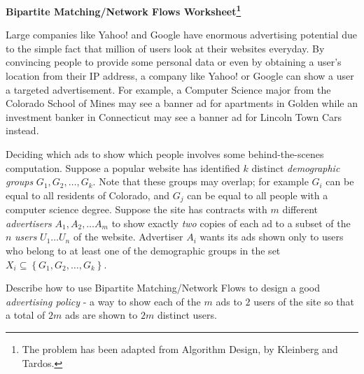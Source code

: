 \documentclass[12pt]{article}
\begin{document}
\newcommand{\I}{\mbox{{\em Int}}}
\newcommand{\lt}{\mbox{{\em left}}}
\newcommand{\rt}{\mbox{{\em right}}}
\newcommand{\ld}{\Delta^l}
\newcommand{\rd}{\Delta^r}
\newcommand{\lsp}[1]{\large\renewcommand{\baselinestretch}{#1}\normalsize}
\newcommand{\hsp}{\hspace{.2in}}

\def\Endwhile{\mbox{\bf endwhile\ }}
\def\Or{\mbox{\bf or\ }}
\def\Do{\mbox{\bf do\ }}
\def\Downto{\mbox{\bf downto\ }}
\def\Int{\mbox{\bf int\ }}
\def\To{\mbox{\bf to\ }}
\def\Repeat{\mbox{\bf repeat\ }}
\def\Until{\mbox{\bf until\ }}
\def\Return{\mbox{\bf return\ }}
\def\Not{\mbox{\bf not\ }}
\def\And{\mbox{\bf and\ }}
\def\For{\mbox{\bf for\ }}
\def\Foreach{\mbox{\bf foreach\ }}
\def\Else{\mbox{\bf else\ }}
\def\Elseif{\mbox{\bf elseif\ }}
\def\End{\mbox{\bf end\ }}
\def\If{\mbox{\bf if\ }}
\def\Mod{\mbox{\bf \ mod\ }}
\def\Then{\mbox{\bf then\ }}
\def\While{\mbox{\bf while\ }}
\def\Output{\mbox{\bf output\ }}


\lsp{1}
\pagestyle{plain}
\begin{center}
{\bf
Bipartite Matching/Network Flows Worksheet\footnote{The problem has been adapted from Algorithm Design, by Kleinberg and Tardos.} 
}
\end{center}

\begin{flushleft}
Large companies like Yahoo! and Google have enormous advertising potential due to the simple fact that million of users look at their websites everyday.  By convincing people to provide some personal data or even by obtaining a user's location from their IP address, a company like Yahoo! or Google can show a user a targeted advertisement.  For example, a Computer Science major from the Colorado School of Mines may see a banner ad for apartments in Golden while an investment banker in Connecticut may see a banner ad for Lincoln Town Cars instead.

   Deciding which ads to show which people involves some behind-the-scenes computation.  Suppose a popular website has identified $k$ distinct \textit{demographic groups} $G_1, G_2, \ldots,G_k$.  Note that these groups may overlap; for example $G_i$ can be equal to all residents of Colorado, and $G_j$ can be equal to all people with a computer science degree.  Suppose the site has contracts with $m$ different \textit{advertisers} $A_1, A_2, \ldots A_m$ to show exactly {\em two} copies of each ad to a subset of the $n$ {\em users} $U_1 \ldots U_n$ of the website.  Advertiser $A_i$ wants its ads shown only to users who belong to at least one of the demographic groups in the set $X_i\subseteq\left\lbrace G_1,G_2,\ldots,G_k\right\rbrace$.

   Describe how to use Bipartite Matching/Network Flows to design a good \textit{advertising policy} - a way to show each of the $m$ ads to $2$ users of the site so that a total of $2m$ ads are shown to $2m$ distinct users.
\end{flushleft}
\end{document}
